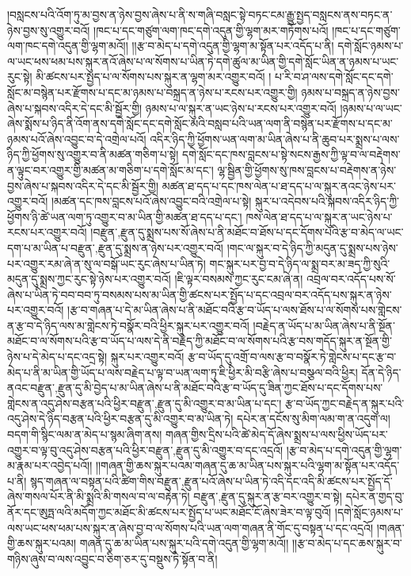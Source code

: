 །བསླངས་པའི་འོག་ཏུ་མ་བྱས་ན་ཉེས་བྱས་ཞེས་པ་ནི་ས་གཞི་བསླང་སྟེ་བཏང་ངམ་རྒྱུ་སྤྱད་བསླངས་ནས་བཏང་ན་ཉེས་བྱས་སུ་འགྱུར་བའོ། །ཁང་པ་དང་གཙུག་ལག་ཁང་དགེ་འདུན་གྱི་ལྷག་མར་གཏོགས་པའོ། །ཁང་པ་དང་གཙུག་ལག་ཁང་དགེ་འདུན་གྱི་ལྷག་མའོ།། །།རྩ་བ་མེད་པ་དགེ་འདུན་གྱི་ལྷག་མ་སྟོན་པར་འདོད་པ་ནི། དགེ་སློང་ཉམས་པ་ལ་ཡང་ཕས་ཕམ་པས་སྐུར་ནའོ་ཞེས་པ་ལ་སོགས་པ་ཡིན་ཏེ་དགེ་ཚུལ་མ་ཡིན་གྱི་དགེ་སློང་ཡིན་ན་ཉམས་པ་ཡང་རུང་སྟེ། མི་ཚངས་པར་སྤྱད་པ་ལ་སོགས་པས་སྐུར་ན་ལྷག་མར་འགྱུར་བའོ། །
པ་རི་བ་ཤ་ལས་དགེ་སློང་དང་དགེ་སློང་མ་བསྙེན་པར་རྫོགས་པ་དང་མ་ཉམས་པ་བསྐྲད་ན་ཉེས་པ་རངས་པར་འགྱུར་གྱི། ཉམས་པ་བསྐྲད་ན་ཉེས་བྱས་ཞེས་པ་སྐབས་འདིར་དེ་དང་མི་སྦྱོར་གྱི། ཉམས་པ་ལ་སྐུར་ན་ཡང་ཉེས་པ་རངས་པར་འགྱུར་བའོ། །ཉམས་པ་ལ་ཡང་ཞེས་སྨོས་པ་ཉིད་ནི་འོག་ནས་དགེ་སློང་དང་དགེ་སློང་མའི་བསླབ་པའི་ཡན་ལག་ནི་བསྙེན་པར་རྫོགས་པ་དང་མ་ཉམས་པའོ་ཞེས་འབྱུང་བ་དེ་འགྲེལ་པའོ། འདིར་ཉིད་ཀྱི་ཕྱོགས་ཡན་ལག་མ་ཡིན་ཞེས་པ་ནི་ཆུབ་པར་སྨྲས་པ་ལས་ཉིད་ཀྱི་ཕྱོགས་སུ་འགྱུར་བ་ནི་མཚན་གཅིག་པ་སྟེ། དགེ་སློང་དང་ཁས་བླངས་པ་སྟེ་སངས་རྒྱས་ཀྱི་ལྟ་བ་ལ་བརྡེགས་ན་ལྟུང་བར་འགྱུར་གྱི་མཚན་མ་གཅིག་པ་དགེ་སློང་མ་དང་། ལྷ་སྦྱིན་གྱི་ཕྱོགས་སུ་ཁས་བླངས་པ་བརྡེགས་ན་ཉེས་བྱས་ཞེས་པ་སྐབས་འདིར་དེ་དང་མི་སྦྱོར་གྱི། མཚན་ཐ་དད་པ་དང་ཁས་ལེན་པ་ཐ་དད་པ་ལ་སྐུར་ནའང་ཉེས་པར་འགྱུར་བའོ། །མཚན་དང་ཁས་བླངས་པའོ་ཞེས་འབྱུང་བའི་འགྲེལ་པ་སྟེ། སྐུར་པ་འདེབས་པའི་སྐབས་འདིར་ཉིད་ཀྱི་ཕྱོགས་ཉི་ཚེ་ཡན་ལག་ཏུ་འགྱུར་བ་མ་ཡིན་གྱི་མཚན་ཐ་དད་པ་དང་། ཁས་ལེན་ཐ་དད་པ་ལ་སྐུར་ན་ཡང་ཉེས་པ་རངས་པར་འགྱུར་བའོ། །{བརྫུན་,རྫུན་}དུ་སྨྲས་པས་སོ་ཞེས་པ་ནི་མཐོང་བ་ཐོས་པ་དང་དོགས་པའི་རྩ་བ་མེད་ལ་ཡང་དག་པ་མ་ཡིན་པ་{བརྫུན་,རྫུན་}དུ་སྨྲས་ན་ཉེས་པར་འགྱུར་བའོ། །གང་ལ་སྐུར་བ་དེ་ཉིད་ཀྱི་མདུན་དུ་སྨྲས་པས་ཉེས་པར་འགྱུར་རམ་ཞེ་ན་སུ་ལ་བསྒོ་ཡང་རུང་ཞེས་པ་ཡིན་ཏེ། གང་སྐུར་པར་བྱ་བ་དེ་ཉིད་ལ་སྨྲ་བར་མ་ཟད་ཀྱི་སུའི་མདུན་དུ་སྨྲས་ཀྱང་རུང་སྟེ་ཉེས་པར་འགྱུར་བའོ། །ཇི་ལྟར་བསམས་ཀྱང་རུང་ངམ་ཞེ་ན། འབྲལ་བར་འདོད་པས་སོ་ཞེས་པ་ཡིན་ཏེ་བབ་བབ་ཏུ་བསམས་པས་མ་ཡིན་གྱི་ཚངས་པར་སྤྱོད་པ་དང་འབྲལ་བར་འདོད་པས་སྐུར་ན་ཉེས་པར་འགྱུར་བའོ། །རྩ་བ་གཞན་པ་དེ་མ་ཡིན་ཞེས་པ་ནི་མཐོང་བའི་རྩ་བ་ཡོད་པ་ལས་ཐོས་པ་ལ་སོགས་པས་གླེངས་ན་རྩ་བ་དེ་ཉིད་ལས་མ་གླེངས་ཏེ་བསྣོར་བའི་ཕྱིར་སྐུར་པར་འགྱུར་བའོ། །བརྗེད་ན་ཡོད་པ་མ་ཡིན་ཞེས་པ་ནི་སྔོན་མཐོང་བ་ལ་སོགས་པའི་རྩ་བ་ཡོད་པ་ལས་དེ་ནི་བརྗེད་ཀྱི་མཐོང་བ་ལ་སོགས་པའི་རྩ་བས་གདོད་སྐུར་ན་སྔོན་གྱི་ཉེས་པ་དེ་མེད་པ་དང་འདྲ་སྟེ། སྐུར་པར་འགྱུར་བའོ། རྩ་བ་ཡོད་དུ་འགྲོ་བ་ལས་རྩ་བ་བསྣོར་ཏེ་གླེངས་པ་དང་རྩ་བ་མེད་པ་ནི་མ་ཡིན་གྱི་ཡོད་པ་ལས་བརྗེད་པ་ལྟ་བ་ཡན་ལག་ཏུ་ཇི་ཕྱིར་མི་བརྩི་ཞེས་པ་བསྩལ་བའི་ཕྱིར། དོན་དེ་ཉིད་ནའང་{བརྫུན་,རྫུན་}དུ་མི་བྱེད་པ་མ་ཡིན་ཞེས་པ་ནི་མཐོང་བའི་རྩ་བ་ཡོད་དུ་ཟིན་ཀྱང་ཐོས་པ་དང་དོགས་པས་གླེངས་ན་འདུ་ཤེས་བརྩན་པའི་ཕྱིར་{བརྫུན་,རྫུན་}དུ་མི་འགྱུར་བ་མ་ཡིན་པ་དང་། རྩ་བ་ཡོད་ཀྱང་བརྗེད་ན་སྐུར་པའི་འདུ་ཤེས་དེ་ཉིད་བརྩན་པའི་ཕྱིར་བརྩན་དུ་མི་འགྱུར་བ་མ་ཡིན་ཏེ། དཔེར་ན་དངོས་སུ་མིག་ལམ་ག་ན་འདུག་ལ། བདག་གི་སྙིང་ལམ་ན་མེད་པ་སྙམ་ཞིག་ནས། གཞན་གྱིས་དྲིས་པའི་ཚེ་མེད་དོ་ཞེས་སྨྲས་པ་ལས་ཕྱིས་ཡོད་པར་འགྱུར་བ་ལྟ་བུ་འདུ་ཤེས་བརྩན་པའི་ཕྱིར་{བརྫུན་,རྫུན་}དུ་མི་འགྱུར་བ་དང་འདྲའོ། །རྩ་བ་མེད་པ་དགེ་འདུན་གྱི་ལྷག་མ་རྣམ་པར་འབྱེད་པའོ།། །།གཞན་གྱི་ཆས་སྐུར་པའམ་གཞན་དུ་ཆ་མ་ཡིན་པས་སྐུར་པའི་ལྷག་མ་སྟོན་པར་འདོད་པ་ནི། སྙད་གཞན་ལ་བསྟན་པའི་ཚིག་གིས་{བརྫུན་,རྫུན་}པའོ་ཞེས་པ་ཡིན་ཏེ་འདི་དང་འདི་མི་ཚངས་པར་སྤྱོད་དོ་ཞེས་གསལ་པོར་ནི་མི་སྨྲའི་མི་གསལ་བ་ལ་བརྟེན་ཏེ། {བརྫུན་,རྫུན་}དུ་སྐུར་ན་རྩ་བར་འགྱུར་བ་སྟེ། དཔེར་ན་གྱད་བུ་ནོར་དང་ཨུཏྤ་ལའི་མདོག་ཀྱང་མཐོང་མི་ཚངས་པར་སྤྱོད་པ་ཡང་མཐོང་ངོ་ཞེས་ཟེར་བ་ལྟ་བུའོ། །དགེ་སློང་ཉམས་པ་ལས་ཡང་ཕས་ཕམ་པས་སྐུར་ན་ཞེས་བྱ་བ་ལ་སོགས་པའི་ཡན་ལག་གཞན་ནི་གོང་དུ་བསྟན་པ་དང་འདྲའོ། །གཞན་གྱི་ཆས་སྐུར་པའམ། གཞན་དུ་ཆ་མ་ཡིན་པས་སྐུར་པའི་དགེ་འདུན་གྱི་ལྷག་མའོ།། །།རྩ་བ་མེད་པ་དང་ཆས་སྐུར་བ་གཉིས་ཞུས་བ་ལས་འབྱུང་བ་ཅིག་ཅར་དུ་བསྡུས་ཏེ་སྟོན་བ་ནི། 